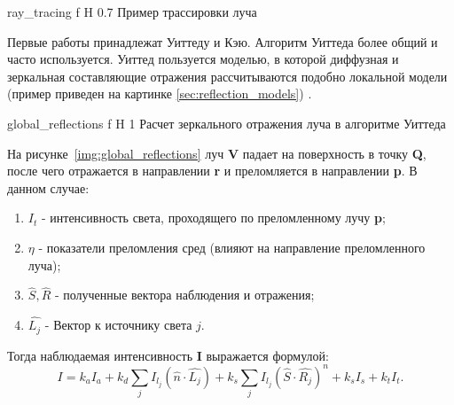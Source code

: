 {ray_tracing} %
{f} %
{H} %
{0.7\textwidth} %
{Пример трассировки луча} %






Первые работы принадлежат Уиттеду и Кэю. Алгоритм Уиттеда более общий и часто используется.
Уиттед пользуется моделью, в которой диффузная и зеркальная составляющие отражения рассчитываются подобно локальной модели (пример приведен на картинке \ref{sec:reflection_models}) \cite{Rodgers}.



{global_reflections} %
{f} %
{H} %
{1\textwidth} %
{Расчет зеркального отражения луча в алгоритме Уиттеда} %


На рисунке~\ref{img:global_reflections} луч \textbf{V} падает на поверхность в точку \textbf{Q}, после чего отражается в направлении \textbf{r} и преломляется
в направлении \textbf{p}.
В данном случае:
\begin{enumerate}
	\item $I_t$ - интенсивность света, проходящего по преломленному лучу \textbf{p};
	\item $\eta$ - показатели преломления сред (влияют на направление преломленного луча);
	\item $\hat{S},\hat{R}$ - полученные вектора наблюдения и отражения;
	\item $\hat{L_j}$ - Вектор к источнику света $j$.

\end{enumerate}

Тогда наблюдаемая интенсивность \textbf{I} выражается формулой:
\begin{equation} 
	I = k_aI_a + k_d \sum_{j} I_{l_j}(\hat{n} \cdot \hat{L_j}) + k_s \sum_{j} I_{l_j}(\hat{S} \cdot \hat{R_j})^n + k_sI_s + k_tI_t.
	\label{eq:intensivity}
\end{equation}

